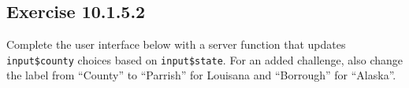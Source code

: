 \documentclass[]{book}
\newenvironment{Shaded}{\begin{snugshade}}{\end{snugshade}}
\newcommand{\DataTypeTok}[1]{\textcolor[rgb]{0.13,0.29,0.53}{#1}}
\newcommand{\KeywordTok}[1]{\textcolor[rgb]{0.13,0.29,0.53}{\textbf{#1}}}
\newcommand{\NormalTok}[1]{#1}
\newcommand{\OperatorTok}[1]{\textcolor[rgb]{0.81,0.36,0.00}{\textbf{#1}}}
\newcommand{\OtherTok}[1]{\textcolor[rgb]{0.56,0.35,0.01}{#1}}
\newcommand{\StringTok}[1]{\textcolor[rgb]{0.31,0.60,0.02}{#1}}
\begin{document}
\hypertarget{exercise-10.1.5.2}{%
\subsection*{Exercise 10.1.5.2}\label{exercise-10.1.5.2}}

Complete the user interface below with a server function that updates \texttt{input\$county} choices based on \texttt{input\$state}. For an added challenge, also change the label from ``County'' to ``Parrish'' for Louisana and ``Borrough'' for ``Alaska''.

\begin{Shaded}
\end{Shaded}
\end{document}
